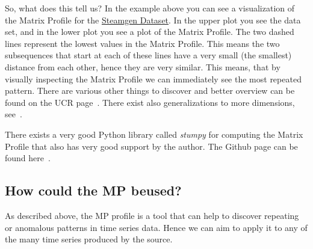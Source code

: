\documentclass[12pt,a4paper]{article}
\begin{document}
So, what does this tell us? In the example above you can see a visualization of the Matrix Profile for the \href{https://www.cs.ucr.edu/~eamonn/iSAX/steamgen.dat}{Steamgen Dataset}. In the upper plot you see the data set, and in the lower plot
you see a plot of the Matrix Profile. The two dashed lines represent the lowest values in the Matrix Profile. This means the two subsequences that start at each of these lines have a very small (the smallest) distance from each other, hence they are very similar. This means, that by visually inspecting the Matrix Profile we can immediately see the most repeated pattern. There are various other things to discover and better overview can be found on the UCR page~\cite{Keogh:UCRMatrixProfile}. There exist also generalizations to more dimensions, see~\cite{Yeh:MatrixProfileVI}.

There exists a very good Python library called \emph{stumpy} for computing the Matrix Profile that also has very good support by the
author. The Github page can be found here~\cite{Law:stumpy}.

\hypertarget{how-could-the-mp-be-used}{%
\subsection{How could the MP beused?}\label{how-could-the-mp-be-used}}

As described above, the MP profile is a tool that can help to discover repeating or anomalous patterns in time series data. Hence we can aim to apply it to any of the many time series produced by the source.
\end{document}

